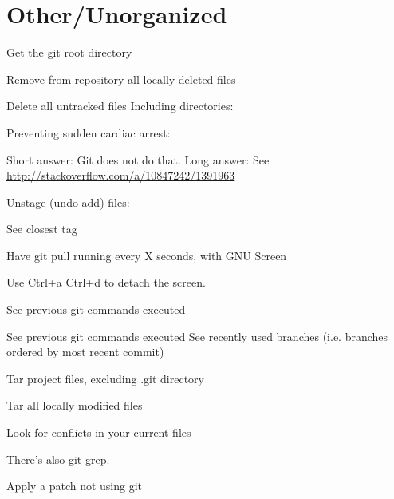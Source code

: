\documentclass{article}
\begin{document}
\section{Other/Unorganized}
\begin{description}[labelwidth=20em, leftmargin=22em]
    \item [git rev-parse --show-toplevel] Get the git root directory
    \item [git rm \$(git ls-files --deleted)]
        Remove from repository all locally deleted files
    \item [git clean -f] Delete all untracked files
        Including directories:
    \item [git clean -f -d]
        Preventing sudden cardiac arrest:
    \item [git clean -n -f -d]
    \item [Show total file size difference between two commits]
        Short answer: Git does not do that.
        Long answer: See \url{http://stackoverflow.com/a/10847242/1391963}
    \item [git reset HEAD file.txt]
        Unstage (undo add) files:
    \item [git describe --tags `git rev-list --tags --max-count=1`]
        See closest tag
    \item [screen]
        Have git pull running every X seconds, with GNU Screen
    \item [for((i=1;i<=10000;i+=1)); do sleep 30 \&\& git pull; done]
        Use Ctrl+a Ctrl+d to detach the screen.
    \item [history | grep git]
        See previous git commands executed
    \item [grep '\^{}git'  /root/.bash\_history]
        See previous git commands executed
    See recently used branches (i.e. branches ordered by most recent commit)
    \item [git for-each-ref --sort=-committerdate refs/heads/ | head]
        Tar project files, excluding .git directory
    \item [cd ..]
    \item [tar cJf project.tar.xz project/ --exclude-vcs]
        Tar all locally modified files
    \item [git diff --name-only | xargs tar -cf project.tar -T -]
        Look for conflicts in your current files
    \item [grep -H -r "<<<" *]
    \item [grep -H -r ">>>" *]
    \item [grep -H -r '\^{}=======\$' *]
        There's also git-grep.
    \item [patch < file.patch]
        Apply a patch not using git
\end{description}
\end{document}
